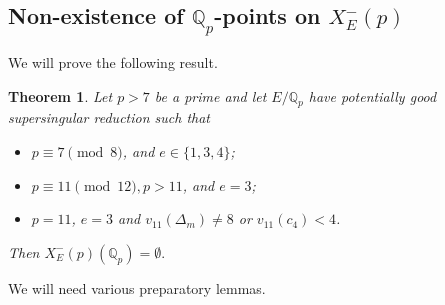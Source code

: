 \documentclass[12pt]{amsart}
\numberwithin{equation}{section}
\newtheorem{theorem}[equation]{Theorem}
\theoremstyle{definition}
\newcommand{\Q}{\mathbb{Q}}
\newcommand{\Xp}{X_E^{-}(p)}
\begin{document}
\subsection{Non-existence of $\Q_p$-points on $\Xp$}
We will prove the following result.

\begin{theorem}\label{thm:l=pss}
Let $p>7$ be a prime and let $E/\Q_p$
have potentially good supersingular reduction such that
\begin{itemize}
    \item[(1)] $p\equiv7\pmod8$, and $e \in \{1,3,4\}$;
    \item[(2)] $p \equiv 11 \pmod {12}, p>11$, and $e=3$;
    \item[(3)] $p=11$, $e=3$ and $v_{11}(\Delta_m)\ne 8$ or $v_{11}(c_4)<4$.
\end{itemize}
Then \(X_E^-(p)(\Q_p)=\emptyset.\)
\end{theorem}

We will need various preparatory lemmas.
\end{document}
